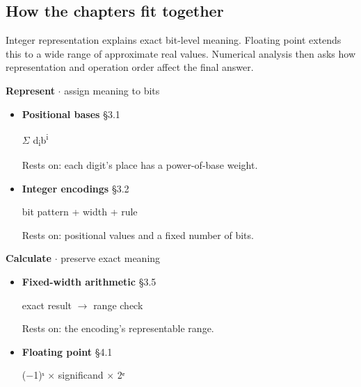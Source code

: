 \documentclass[11pt]{article}
\begin{document}
\begin{keepsection}
\section{How the chapters fit together}

Integer representation explains exact bit-level meaning. Floating point extends this to a wide range of approximate real values. Numerical analysis then asks how representation and operation order affect the final answer.

\textbf{Represent} \ensuremath{\cdot} assign meaning to bits

\begin{itemize}
\item 
{}
\textbf{Positional bases} \hfill{\small\color{FAUblue}§3.1}

\ensuremath{\Sigma} d\textsubscript{i}b\textsuperscript{i}

Rests on: each digit's place has a power-of-base weight.

\item 
{}
\textbf{Integer encodings} \hfill{\small\color{FAUblue}§3.2}

bit pattern + width + rule

Rests on: positional values and a fixed number of bits.

\end{itemize}

\textbf{Calculate} \ensuremath{\cdot} preserve exact meaning

\begin{itemize}
\item 
{}
\textbf{Fixed-width arithmetic} \hfill{\small\color{FAUblue}§3.5}

exact result \ensuremath{\to} range check

Rests on: the encoding's representable range.

\item 
{}
\textbf{Floating point} \hfill{\small\color{FAUblue}§4.1}

(\ensuremath{-}1)ˢ \ensuremath{\times} significand \ensuremath{\times} 2ᵉ


\end{itemize}
\end{keepsection}
\end{document}
